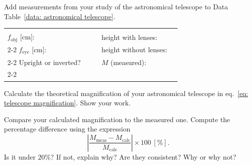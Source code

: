 \documentclass[addpoints]{physlabs}
\begin{document}
\begin{postlab}

    \pagebreak


        \filbreak
        \question[1] Add measurements from your study of the astronomical telescope to Data Table~\ref{data: astronomical telescope}.

        \begin{center}
            \renewcommand{\arraystretch}{2}
            \captionsetup{font=normalsize}
            \begin{tabular}{l>{\centering\arraybackslash}p{3cm}cl>{\centering\arraybackslash}p{3cm}}
                \hline
                & & & & \\
                $f_\text{obj}$ [cm]: & & & height with lenses: & \\
                \cline{2-2}\cline{5-5}
                $f_\text{eye}$ [cm]: & & & height without lenses: & \\
                \cline{2-2}\cline{5-5}
                Upright or inverted? & & & $M$ (measured): & \\
                \cline{2-2}\cline{5-5}
            \end{tabular}
        \end{center}
        \begin{solution}[1cm]   
        \end{solution}

        \filbreak
        \question[1] Calculate the theoretical magnification of your astronomical telescope in eq.~\ref{eq: telescope magnification}. Show your work.
        \begin{solution}[3cm]   
        \end{solution}

        \filbreak
        \question[1] Compare your calculated magnification to the measured one. Compute the percentage difference using the expression
        \[
            \left|\frac{M_\text{meas} - M_\text{calc}}{M_\text{calc}}\right|\times 100~[\%].
        \]
        Is it under 20\%? If not, explain why? Are they consistent? Why or why not?
        \begin{solution}[3cm]   
        \end{solution}
    

\end{postlab}
\end{document}
